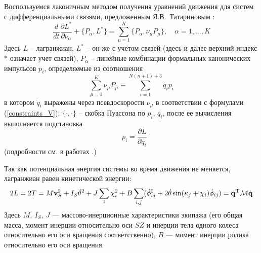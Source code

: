 Воспользуемся лаконичным методом получения уравнений движения для систем с дифференциальными связями, предложенным Я.В.~Татариновым \cite{Tatarinov}:
\begin{equation}\label{Tatarinov}
    \frac{d}{dt}\frac{\partial L^{*}}{\partial \nu_\alpha}  + \{P_\alpha, L^{*}\} = \sum\limits_{\mu = 1}^{K}\{P_\alpha, \nu_\mu P_\mu\},\quad \alpha = 1,\dots, K
\end{equation}
Здесь $L$ -- лагранжиан, $L^*$ -- он же с учетом связей (здесь и далее верхний индекс $*$ означает учет связей), $P_\alpha$ -- линейные комбинации формальных канонических импульсов $p_i$, определяемые из соотношения 
$$\sum\limits_{\mu=1}^{K}\nu_\mu P_\mu \equiv \sum\limits_{i=1}^{N(n+1)+3}\dot{q_i} p_i$$
 в котором $\dot{q}_i$ выражены через псевдоскорости $\nu_\mu$ в соответствии с формулами (\ref{constraints_V}); $\{\cdot, \cdot\}$ -- скобка Пуассона по $p_i$, $q_i$, после ее вычисления выполняется подстановка 
$$\hspace{10pt} p_i = \frac{\partial L}{\partial \dot{q}_i}$$
(подробности см. в работах \cite{Tatarinov,Zobova2011}.)

Так как потенциальная энергия системы во время движения не меняется, лагранжиан  равен кинетической энергии:
\begin{equation}\label{kin_en}
    2L = 2T = M\boldsymbol{\mathbf{v}}_S^2 + I_S\dot{\theta}^2 + J\sum_i\dot{\chi}_i^2 + B\sum_{i,j}(\dot{\phi}_{ij}^2 + 2\dot{\theta}\sin(\kappa_j + \chi_i)\dot{\phi}_{ij})=\dot{\boldsymbol{\mathbf{q}}}^\mathrm{T}\mathcal{M}\dot{\boldsymbol{\mathbf{q}}}
\end{equation}
Здесь $M,\ I_S,\ J$ --- массово-инерционные характеристики экипажа (его общая масса, момент инерции относительно оси $SZ$ и инерции тела одного колеса относительно его оси вращения соответственно), $B$ --- момент инерции ролика относительно его оси вращения.

